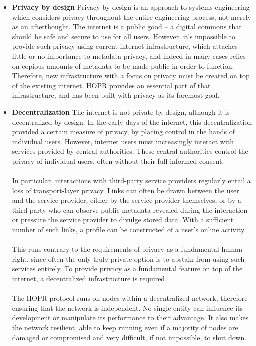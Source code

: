 \begin{itemize}

    \item \textbf{Privacy by design} Privacy by design is an approach to systems engineering which
        considers privacy throughout the entire engineering process, not merely as an afterthought. The internet is a public good –
        a digital commons that should be safe and secure to use for all users.
        However, it's impossible to provide such privacy using current
        internet infrastructure, which attaches little or no importance to metadata privacy, and indeed in many cases relies on copious amounts of metadata to be made public in order to function. Therefore, new infrastructure with a focus on privacy must be created on top of the existing internet. HOPR provides an essential part of that infrastructure, and has been built with privacy as its foremost goal.

    \item \textbf{Decentralization} The internet is not private by design, although it is decentralized by design. In the early days of the internet, this decentralization provided a certain measure of privacy, by placing control in the hands of individual users. 
        However, internet users must increasingly interact with services provided by central
        authorities. These central authorities control the privacy of individual users, often without their full informed consent. 
        \\~\\In particular, interactions with third-party service providers regularly entail a loss of transport-layer privacy. Links can often be drawn between the user and the service provider, either by the service provider themselves, or by a third party who can observe public metadata revealed during the interaction or pressure the service provider to divulge stored data. With a sufficient number of such links, a profile can be constructed of a user's online activity. 
        \\~\\This runs contrary to the requirements of privacy as a fundamental human right, since often the only truly private option is to abstain from using such services entirely. To provide privacy as a fundamental feature on top of the internet, a decentralized infrastructure is required.
        \\~\\The HOPR protocol runs on nodes within a decentralized network, therefore ensuring that the network is independent. No single entity can influence its development or manipulate its performance to their advantage. It also makes the network resilient, able to keep running even if a majority of nodes are damaged or compromised and very difficult, if not impossible, to shut down.


\end{itemize}
